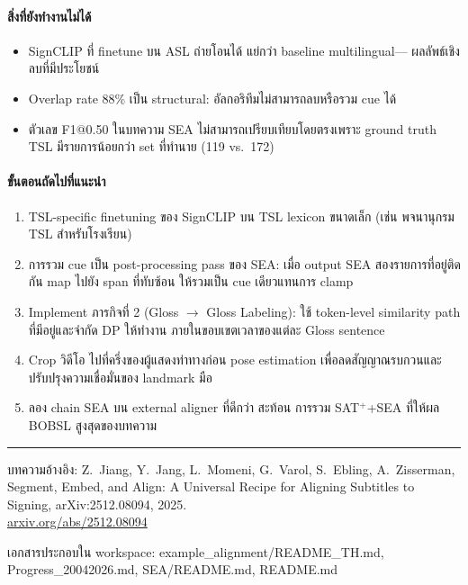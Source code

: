 \documentclass[11pt,a4paper]{article}
\def\texttt#1{#1}%
\def\textbf#1{#1}%
\def\textit#1{#1}%
\def\emph#1{#1}%
\begin{document}
\paragraph{สิ่งที่ยังทำงานไม่ได้}
\begin{itemize}[leftmargin=1.5em]
  \item SignCLIP ที่ finetune บน ASL ถ่ายโอนได้ \emph{แย่กว่า} baseline multilingual---
        ผลลัพธ์เชิงลบที่มีประโยชน์
  \item Overlap rate 88\% เป็น structural: อัลกอริทึมไม่สามารถลบหรือรวม cue ได้
  \item ตัวเลข F1@0.50 ในบทความ SEA ไม่สามารถเปรียบเทียบโดยตรงเพราะ
        ground truth TSL มีรายการน้อยกว่า set ที่ทำนาย (119 vs.\ 172)
\end{itemize}

\paragraph{ขั้นตอนถัดไปที่แนะนำ}
\begin{enumerate}[leftmargin=1.5em]
  \item \textbf{TSL-specific finetuning ของ SignCLIP} บน TSL lexicon ขนาดเล็ก
        (เช่น พจนานุกรม TSL สำหรับโรงเรียน)
  \item \textbf{การรวม cue} เป็น post-processing pass ของ SEA:
        เมื่อ output SEA สองรายการที่อยู่ติดกัน map ไปยัง span ที่ทับซ้อน
        ให้รวมเป็น cue เดียวแทนการ clamp
  \item \textbf{Implement ภารกิจที่ 2} (Gloss $\to$ Gloss Labeling):
        ใช้ token-level similarity path ที่มีอยู่และจำกัด DP ให้ทำงาน
        ภายในขอบเขตเวลาของแต่ละ Gloss sentence
  \item \textbf{Crop วิดีโอ} ไปที่ครึ่งของผู้แสดงท่าทางก่อน pose estimation
        เพื่อลดสัญญาณรบกวนและปรับปรุงความเชื่อมั่นของ landmark มือ
  \item \textbf{ลอง chain SEA บน external aligner} ที่ดีกว่า สะท้อน
        การรวม SAT$^{+}$+SEA ที่ให้ผล BOBSL สูงสุดของบทความ
\end{enumerate}

\bigskip\hrule\bigskip
\noindent\small\textit{บทความอ้างอิง:}
Z.\ Jiang, Y.\ Jang, L.\ Momeni, G.\ Varol, S.\ Ebling, A.\ Zisserman,
\emph{Segment, Embed, and Align: A Universal Recipe for Aligning Subtitles
to Signing}, arXiv:2512.08094, 2025.\\
\href{https://arxiv.org/abs/2512.08094}{arxiv.org/abs/2512.08094}

\bigskip\noindent\small\textit{เอกสารประกอบใน workspace:}
\texttt{example\_alignment/README\_TH.md}, \texttt{Progress\_20042026.md},
\texttt{SEA/README.md}, \texttt{README.md}
\end{document}
